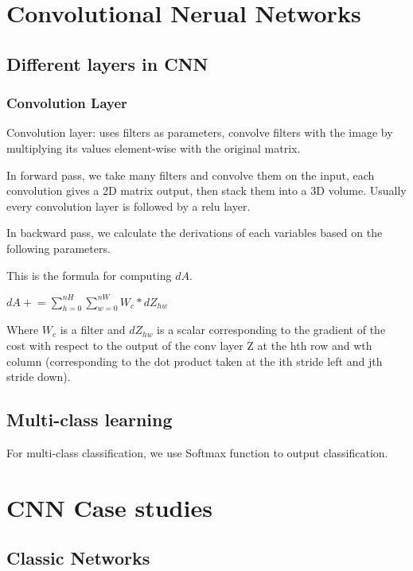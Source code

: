 \documentclass{article}
\begin{document}
\section{Convolutional Nerual Networks}
\subsection{Different layers in CNN}
	\subsubsection{Convolution Layer}
		\begin{flushleft}
			Convolution layer: uses filters as parameters, convolve filters with the image by multiplying its values element-wise with the original matrix.
		\end{flushleft}
		\begin{flushleft}
			In forward pass, we take many filters and convolve them on the input, each convolution gives a 2D matrix output, then stack them into a 3D volume. Usually every convolution layer is followed by a relu layer.
		\end{flushleft}
		\begin{flushleft}
			In backward pass, we calculate the derivations of each variables based on the following parameters.
		\end{flushleft}
		This is the formula for computing $dA$.
		\begin{center}
			$dA \mathrel{+}= \sum_{h=0}^{nH} \sum_{w=0}^{nW} W_c * dZ_{hw}$
		\end{center}
		\begin{flushleft}
			Where $W_c$ is a filter and $dZ_{hw}$ is a scalar corresponding to the gradient of the cost with respect to the output of the conv layer Z at the hth row and wth column (corresponding to the dot product taken at the ith stride left and jth stride down).	
		\end{flushleft}
	\subsection{Multi-class learning}
		For multi-class classification, we use Softmax function to output classification.

\section{CNN Case studies}
	\subsection{Classic Networks}
\end{document}
